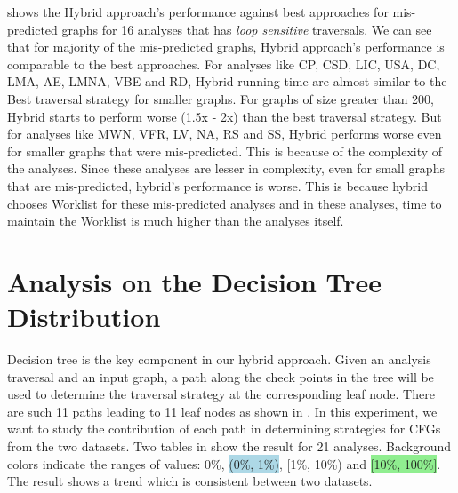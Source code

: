 

 shows the Hybrid approach's performance against best 
approaches for mis-predicted graphs for 16 analyses that has \emph{loop sensitive} traversals. We can see that for 
majority of the mis-predicted graphs, Hybrid approach's performance is 
comparable to the best approaches. For analyses like CP, CSD, LIC, USA, DC, LMA, AE, LMNA, VBE and RD, Hybrid running time are almost similar to the Best traversal strategy for smaller graphs. For graphs of size greater than 200, Hybrid starts to perform worse (1.5x - 2x) than the best traversal strategy. But for analyses like MWN, VFR, LV, NA, RS and SS, Hybrid performs worse even for smaller graphs that were mis-predicted. This is because of the complexity of the analyses. Since these analyses are lesser in complexity, even for small graphs that are mis-predicted, hybrid's performance is worse. This is because hybrid chooses Worklist for these mis-predicted analyses and in these analyses, time to maintain the Worklist is much higher than the analyses itself.

\chapter{Analysis on the Decision Tree Distribution}
\label{sec:analysis-decision-tree}





Decision tree is the key component in our hybrid approach. Given an analysis 
traversal and an input graph, a path along the check points in the tree will 
be used to determine the traversal strategy at the corresponding leaf node. 
There are such 11 paths leading to 11 leaf nodes as shown in . 
%
In this experiment, we want to study the contribution of each path in 
determining strategies for CFGs from the two datasets. Two tables in 
 show the result for 21 analyses. Background colors indicate the ranges of values: \colorbox{lightred}{0\%}, 
\colorbox{lightblue}{(0\%, 1\%)}, \colorbox{lightblack}{[1\%, 10\%)} and \colorbox{lightgreen}{[10\%, 100\%]}.
%
The result shows a trend which is consistent between two datasets. 


